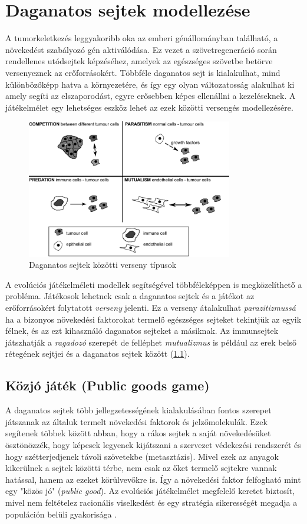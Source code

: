 \chapter{Daganatos sejtek modellezése}
A tumorkeletkezés leggyakoribb oka az emberi génállományban található, a növekedést szabályozó gén aktiválódása. Ez vezet a szövetregeneráció során rendellenes utódsejtek képzéséhez, amelyek az egészséges szövetbe betörve versenyeznek az erőforrásokért. Többféle daganatos sejt is kialakulhat, mind különbözőképp hatva a környezetére, és így egy olyan változatosság alakulhat ki amely segíti az elszaporodást, egyre erősebben képes ellenállni a kezeléseknek. A játékelmélet egy lehetséges eszköz lehet az ezek közötti versengés modellezésére.

\begin{figure}[h!]
	\centering
	\includegraphics[width=90mm]{images/models}
	\vspace*{2mm}
	\caption{Daganatos sejtek közötti verseny típusok}
	\label{fig:cancerModels}
\end{figure}

A evolúciós játékelméleti modellek segítségével többféleképpen is megközelíthető a probléma. Játékosok lehetnek csak a daganatos sejtek és a játékot az erőforrásokért folytatott \textit{verseny} jelenti. Ez a verseny átalakulhat \textit{parazitizmussá} ha a bizonyos növekedési faktorokat termelő egészséges sejteket tekintjük az egyik félnek, és az ezt kihasználó daganatos sejteket a másiknak. Az immunsejtek játszhatják a \textit{ragadozó} szerepét de felléphet \textit{mutualizmus} is például az erek belső rétegének sejtjei és a daganatos sejtek között (\ref{fig:cancerModels}). 

\section{Közjó játék (Public goods game)}
A daganatos sejtek több jellegzetességének kialakulásában fontos szerepet játszanak az általuk termelt növekedési faktorok és jelzőmolekulák. Ezek segítenek többek között abban, hogy a rákos sejtek a saját növekedésüket ösztönözzék, hogy képesek legyenek kijátszani a szervezet védekezési rendszerét és hogy szétterjedjenek távoli szövetekbe (metasztázis). Mivel ezek az anyagok kikerülnek a sejtek közötti térbe, nem csak az őket termelő sejtekre vannak hatással, hanem az ezeket körülvevőkre is. Így a növekedési faktor felfogható mint egy "közös jó" (\textit{public good}). Az evolúciós játékelmélet megfelelő keretet biztosít, mivel nem feltételez racionális viselkedést és egy stratégia sikerességét megadja a populáción belüli gyakorisága \cite{archetti2016cooperation}.

